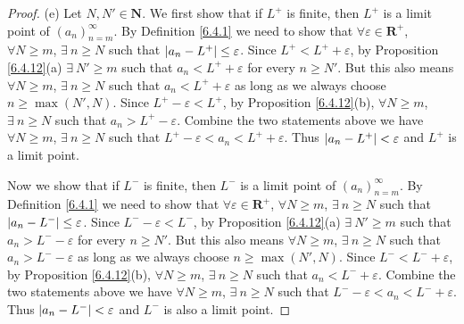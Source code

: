 \begin{proof}{(e)}
    Let \(N, N' \in \mathbf{N}\).
    We first show that if \(L^+\) is finite, then \(L^+\) is a limit point of \((a_n)_{n = m}^\infty\).
    By Definition \ref{6.4.1} we need to show that \(\forall \varepsilon \in \mathbf{R}^+\), \(\forall N \geq m\), \(\exists\ n \geq N\) such that \(\abs*{a_n - L^+} \leq \varepsilon\).
    Since \(L^+ < L^+ + \varepsilon\), by Proposition \ref{6.4.12}(a) \(\exists\ N' \geq m\) such that \(a_n < L^+ + \varepsilon\) for every \(n \geq N'\).
    But this also means \(\forall N \geq m\), \(\exists\ n \geq N\) such that \(a_n < L^+ + \varepsilon\) as long as we always choose \(n \geq \max(N', N)\).
    Since \(L^+ - \varepsilon < L^+\), by Proposition \ref{6.4.12}(b), \(\forall N \geq m\), \(\exists\ n \geq N\) such that \(a_n > L^+ - \varepsilon\).
    Combine the two statements above we have \(\forall N \geq m\), \(\exists\ n \geq N\) such that \(L^+ - \varepsilon < a_n < L^+ + \varepsilon\).
    Thus \(\abs*{a_n - L^+} < \varepsilon\) and \(L^+\) is a limit point.

    Now we show that if \(L^-\) is finite, then \(L^-\) is a limit point of \((a_n)_{n = m}^\infty\).
    By Definition \ref{6.4.1} we need to show that \(\forall \varepsilon \in \mathbf{R}^+\), \(\forall N \geq m\), \(\exists\ n \geq N\) such that \(\abs*{a_n - L^-} \leq \varepsilon\).
    Since \(L^- - \varepsilon < L^-\), by Proposition \ref{6.4.12}(a) \(\exists\ N' \geq m\) such that \(a_n > L^- - \varepsilon\) for every \(n \geq N'\).
    But this also means \(\forall N \geq m\), \(\exists\ n \geq N\) such that \(a_n > L^- - \varepsilon\) as long as we always choose \(n \geq \max(N', N)\).
    Since \(L^- < L^- + \varepsilon\), by Proposition \ref{6.4.12}(b), \(\forall N \geq m\), \(\exists\ n \geq N\) such that \(a_n < L^- + \varepsilon\).
    Combine the two statements above we have \(\forall N \geq m\), \(\exists\ n \geq N\) such that \(L^- - \varepsilon < a_n < L^- + \varepsilon\).
    Thus \(\abs*{a_n - L^-} < \varepsilon\) and \(L^-\) is also a limit point.
\end{proof}

